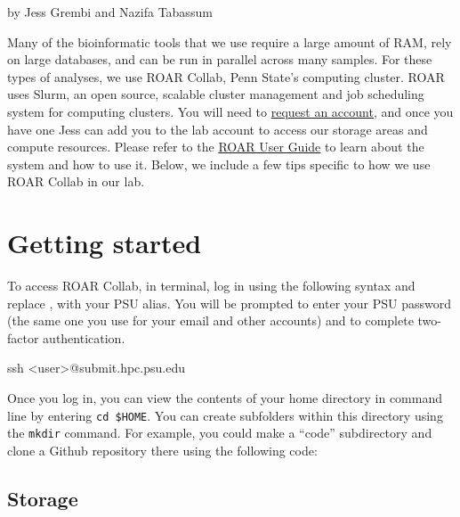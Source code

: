 \documentclass[
]{book}
\newenvironment{Shaded}{\begin{snugshade}}{\end{snugshade}}
\newcommand{\NormalTok}[1]{#1}
\begin{document}
by Jess Grembi and Nazifa Tabassum

Many of the bioinformatic tools that we use require a large amount of RAM, rely on large databases, and can be run in parallel across many samples. For these types of analyses, we use ROAR Collab, Penn State's computing cluster. ROAR uses Slurm, an open source, scalable cluster management and job scheduling system for computing clusters. You will need to \href{https://www.icds.psu.edu/account-setup/}{request an account}, and once you have one Jess can add you to the lab account to access our storage areas and compute resources. Please refer to the \href{https://docs.icds.psu.edu}{ROAR User Guide} to learn about the system and how to use it. Below, we include a few tips specific to how we use ROAR Collab in our lab.

\section{Getting started}\label{getting-started}

To access ROAR Collab, in terminal, log in using the following syntax and replace , with your PSU alias. You will be prompted to enter your PSU password (the same one you use for your email and other accounts) and to complete two-factor authentication.

\begin{Shaded}
\begin{Highlighting}[]
\NormalTok{ssh \textless{}user\textgreater{}@submit.hpc.psu.edu}
\end{Highlighting}
\end{Shaded}

Once you log in, you can view the contents of your home directory in command line by entering \texttt{cd\ \$HOME}. You can create subfolders within this directory using the \texttt{mkdir} command. For example, you could make a ``code'' subdirectory and clone a Github repository there using the following code:

\begin{Shaded}
\end{Shaded}

\subsection{Storage}\label{storage}
\end{document}
